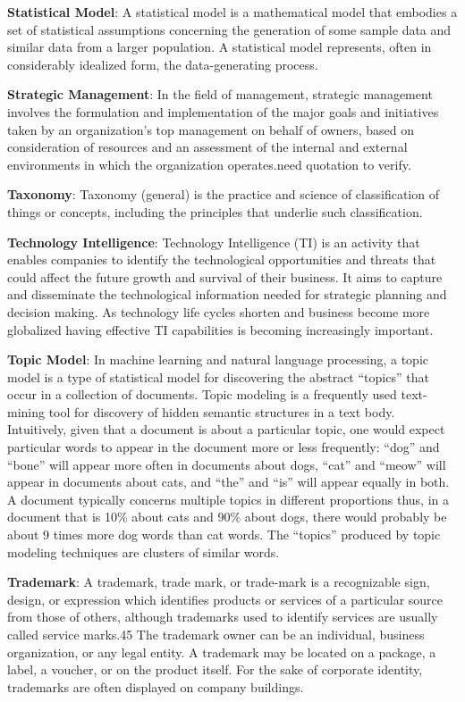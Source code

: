 \documentclass[]{book}
\theoremstyle{definition}
\theoremstyle{definition}
\theoremstyle{definition}
\theoremstyle{remark}
\begin{document}
\textbf{Statistical Model}: A statistical model is a mathematical model
that embodies a set of statistical assumptions concerning the generation
of some sample data and similar data from a larger population. A
statistical model represents, often in considerably idealized form, the
data-generating process.

\textbf{Strategic Management}: In the field of management, strategic
management involves the formulation and implementation of the major
goals and initiatives taken by an organization's top management on
behalf of owners, based on consideration of resources and an assessment
of the internal and external environments in which the organization
operates.need quotation to verify.

\textbf{Taxonomy}: Taxonomy (general) is the practice and science of
classification of things or concepts, including the principles that
underlie such classification.

\textbf{Technology Intelligence}: Technology Intelligence (TI) is an
activity that enables companies to identify the technological
opportunities and threats that could affect the future growth and
survival of their business. It aims to capture and disseminate the
technological information needed for strategic planning and decision
making. As technology life cycles shorten and business become more
globalized having effective TI capabilities is becoming increasingly
important.

\textbf{Topic Model}: In machine learning and natural language
processing, a topic model is a type of statistical model for discovering
the abstract ``topics'' that occur in a collection of documents. Topic
modeling is a frequently used text-mining tool for discovery of hidden
semantic structures in a text body. Intuitively, given that a document
is about a particular topic, one would expect particular words to appear
in the document more or less frequently: ``dog'' and ``bone'' will
appear more often in documents about dogs, ``cat'' and ``meow'' will
appear in documents about cats, and ``the'' and ``is'' will appear
equally in both. A document typically concerns multiple topics in
different proportions thus, in a document that is 10\% about cats and
90\% about dogs, there would probably be about 9 times more dog words
than cat words. The ``topics'' produced by topic modeling techniques are
clusters of similar words.

\textbf{Trademark}: A trademark, trade mark, or trade-mark is a
recognizable sign, design, or expression which identifies products or
services of a particular source from those of others, although
trademarks used to identify services are usually called service marks.45
The trademark owner can be an individual, business organization, or any
legal entity. A trademark may be located on a package, a label, a
voucher, or on the product itself. For the sake of corporate identity,
trademarks are often displayed on company buildings.
\end{document}

